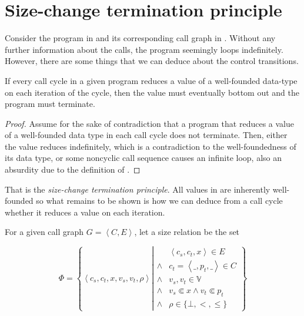 \section{Size-change termination principle}

Consider the program in  and its corresponding call
graph in . Without any further information about
the calls, the program seemingly loops indefinitely. However,
there are some things that we can deduce about the control transitions.

\begin{theorem}\label{theorem:size-change} If every call cycle in a given
program reduces a value of a well-founded data-type on each iteration of the
cycle, then the value must eventually bottom out and the program must
terminate.\end{theorem}

\begin{proof} Assume for the sake of contradiction that a program that reduces
a value of a well-founded data type in each call cycle does not terminate.
Then, either the value reduces indefinitely, which is a contradiction to the
well-foundedness of its data type, or some noncyclic call sequence causes an
infinite loop, also an absurdity due to the definition of \D{}. \end{proof}

That is the \emph{size-change termination principle}\cite{size-change}. All
values in \D{} are inherently well-founded so what remains to be shown is how
we can deduce from a call cycle whether it reduces a value on each iteration.

\begin{definition}\label{definition:size-relation} For a given call
graph $G = \left\langle C,E \right\rangle$, let a size relation be the set

$$
\Phi = \left\{ \left\langle c_s, c_t,x, v_s, v_t, \rho \right\rangle \left| 
\begin{array}{ll}
&\left\langle c_s, c_t,x \right\rangle \in E\\
\wedge&c_t = \left\langle \_, p_t, \_ \right\rangle \in C \\
\wedge&v_s,v_t\in\mathbb{V}\\
\wedge&v_s\Subset x \wedge v_t \Subset p_t \\
\wedge&\rho\in\{\bot, <, \leq\}
\end{array}
\right.\right\}
$$

\end{definition}

